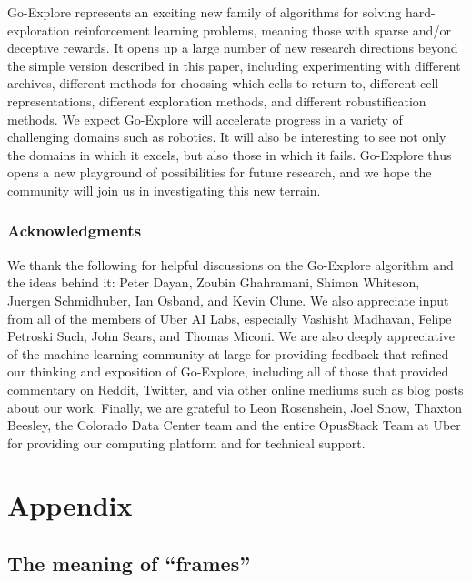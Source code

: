 \documentclass{article}
\begin{document}
Go-Explore represents an exciting new family of algorithms for solving hard-exploration reinforcement learning problems, meaning those with sparse and/or deceptive rewards. It opens up a large number of new research directions beyond the simple version described in this paper, including experimenting with different archives, different methods for choosing which cells to return to, different cell representations, different exploration methods, and different robustification methods. We expect Go-Explore will accelerate progress in a variety of challenging domains such as robotics. It will also be interesting to see not only the domains in which it excels, but also those in which it fails. Go-Explore thus opens a new playground of possibilities for future research, and we hope the community will join us in investigating this new terrain. 


\subsubsection*{Acknowledgments}
We thank the following for helpful discussions on the Go-Explore algorithm and the ideas behind it: Peter Dayan, Zoubin Ghahramani, Shimon Whiteson, Juergen Schmidhuber, Ian Osband, and Kevin Clune. We also appreciate input from all of the members of Uber AI Labs, especially Vashisht Madhavan, Felipe Petroski Such, John Sears, and Thomas Miconi. We are also deeply appreciative of the machine learning community at large for providing feedback that refined our thinking and exposition of Go-Explore, including all of those that provided commentary on Reddit, Twitter, and via other online mediums such as blog posts about our work. Finally, we are grateful to Leon Rosenshein, Joel Snow, Thaxton Beesley, the Colorado Data Center team and the entire OpusStack Team at Uber for providing our computing platform and for technical support.

{\small}

\appendix

\section{Appendix}

\subsection{The meaning of ``frames''}
\label{sec:frame_definition}
\end{document}
